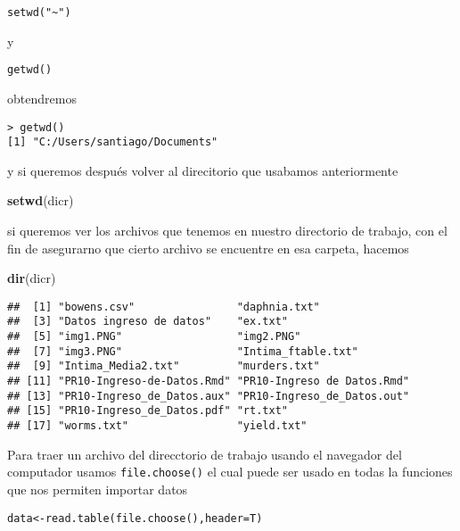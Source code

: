 \documentclass[]{article}
\newenvironment{Shaded}{\begin{snugshade}}{\end{snugshade}}
\newcommand{\KeywordTok}[1]{\textcolor[rgb]{0.13,0.29,0.53}{\textbf{#1}}}
\newcommand{\NormalTok}[1]{#1}
\begin{document}
\begin{verbatim}
setwd("~")
\end{verbatim}

y

\begin{verbatim}
getwd()
\end{verbatim}

obtendremos

\begin{verbatim}
> getwd()
[1] "C:/Users/santiago/Documents"
\end{verbatim}

y si queremos después volver al direcitorio que usabamos anteriormente

\begin{Shaded}
\begin{Highlighting}[]
\KeywordTok{setwd}\NormalTok{(dicr)}
\end{Highlighting}
\end{Shaded}

si queremos ver los archivos que tenemos en nuestro directorio de
trabajo, con el fin de asegurarno que cierto archivo se encuentre en esa
carpeta, hacemos

\begin{Shaded}
\begin{Highlighting}[]
\KeywordTok{dir}\NormalTok{(dicr)}
\end{Highlighting}
\end{Shaded}

\begin{verbatim}
##  [1] "bowens.csv"                "daphnia.txt"              
##  [3] "Datos ingreso de datos"    "ex.txt"                   
##  [5] "img1.PNG"                  "img2.PNG"                 
##  [7] "img3.PNG"                  "Intima_ftable.txt"        
##  [9] "Intima_Media2.txt"         "murders.txt"              
## [11] "PR10-Ingreso-de-Datos.Rmd" "PR10-Ingreso de Datos.Rmd"
## [13] "PR10-Ingreso_de_Datos.aux" "PR10-Ingreso_de_Datos.out"
## [15] "PR10-Ingreso_de_Datos.pdf" "rt.txt"                   
## [17] "worms.txt"                 "yield.txt"
\end{verbatim}

Para traer un archivo del direcctorio de trabajo usando el navegador del
computador usamos \texttt{file.choose()} el cual puede ser usado en
todas la funciones que nos permiten importar datos

\begin{verbatim}
data<-read.table(file.choose(),header=T)
\end{verbatim}
\end{document}
